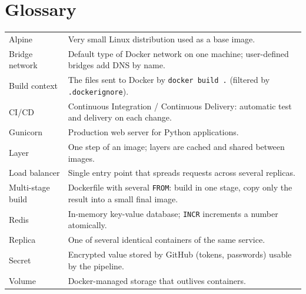 \documentclass[11pt,a4paper]{article}
\begin{document}
\section{Glossary}
\begin{center}\small
\begin{tabularx}{\textwidth}{lX}
\toprule
Alpine & Very small Linux distribution used as a base image.\\
Bridge network & Default type of Docker network on one machine; user-defined bridges add DNS by name.\\
Build context & The files sent to Docker by \texttt{docker build .} (filtered by \texttt{.dockerignore}).\\
CI/CD & Continuous Integration / Continuous Delivery: automatic test and delivery on each change.\\
Gunicorn & Production web server for Python applications.\\
Layer & One step of an image; layers are cached and shared between images.\\
Load balancer & Single entry point that spreads requests across several replicas.\\
Multi-stage build & Dockerfile with several \texttt{FROM}: build in one stage, copy only the result into a small final image.\\
Redis & In-memory key-value database; \texttt{INCR} increments a number atomically.\\
Replica & One of several identical containers of the same service.\\
Secret & Encrypted value stored by GitHub (tokens, passwords) usable by the pipeline.\\
Volume & Docker-managed storage that outlives containers.\\
\bottomrule
\end{tabularx}
\end{center}
\end{document}
